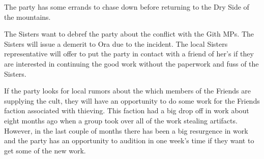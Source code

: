 The party has some errands to chase down before returning to the Dry Side of the mountains.

The Sisters want to debref the party about the conflict with the Gith MPs.
The Sisters will issue a demerit to Ora due to the incident.
The local Sisters representative will offer to put the party in contact with a friend of her's if they are interested in continuing the good work without the paperwork and fuss of the Sisters.

If the party looks for local rumors about the which members of the Friends are supplying the cult, they will have an opportunity to do some work for the Friends faction associated with thieving.
This faction had a big drop off in work about eight months ago when a group took over all of  the work stealing artifacts.
However, in the last couple of months there has been a big resurgence in work and the party has an opportunity to audition in one week's time if they want to get some of the new work.
